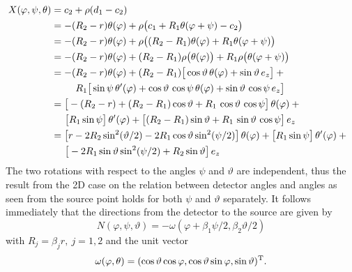 \documentclass{amsart}
\renewcommand*{\phi}{\varphi}
\begin{document}
\begin{align}
 X(\phi, \psi, \theta)
 &= c_2 + \rho(d_1 - c_2) \notag \\
 &= -(R_2 - r) \theta(\phi) + \rho\big(c_1 + R_1 \theta(\phi + \psi) - c_2\big) \notag \\
 &= -(R_2 - r) \theta(\phi) + \rho\big((R_2-R_1) \theta(\phi) + R_1 \theta(\phi + \psi)\big) \notag \\
 &= -(R_2 - r) \theta(\phi) + (R_2-R_1) \rho\big(\theta(\phi)\big) + R_1 \rho\big(\theta(\phi + \psi)\big) \notag \\
 &= -(R_2 - r) \theta(\phi) + (R_2-R_1) \big[ \cos\vartheta\, \theta(\phi) + \sin\vartheta\, e_z \big] + \phantom{x} \notag \\
 &\hspace{25pt} R_1 \big[ \sin\psi\, \theta'(\phi) + \cos\vartheta\, \cos\psi\, \theta(\phi) + \sin\vartheta\, \cos\psi\, e_z \big] \notag 
 \\
 &= \big[ -(R_2 - r) + (R_2 - R_1) \cos\vartheta + R_1 \, \cos\vartheta\, \cos\psi \big]\, \theta(\phi) + \phantom{x} \notag \\
 &\hspace{14pt} \big[R_1 \sin\psi\big]\, \theta'(\phi) + \big[ (R_2 - R_1) \sin\vartheta + R_1\, \sin\vartheta\, \cos\psi \big]\, e_z 
\notag  \\
 \label{eq:conecurved:detector_parametr}
 &= \big[ r - 2R_2 \sin^2(\vartheta/2) - 2R_1 \cos\vartheta \sin^2(\psi/2) \big]\, \theta(\phi) + \big[R_1 \sin\psi\big]\, 
 \theta'(\phi) + \phantom{x} \\
 &\hspace{14pt} \big[ -2R_1 \sin\vartheta\sin^2(\psi/2) + R_2\sin\vartheta \big]\, e_z \notag 
\end{align}
%
%
The two rotations with respect to the angles $\psi$ and $\vartheta$ are independent, thus the result from the 2D case on the relation 
between detector angles and angles as seen from the source point holds for both $\psi$ and $\vartheta$ separately. It follows immediately 
that the directions from the detector to the source are given by
%
\begin{equation}
 \label{eq:conecurved:direction_field}
 N(\phi, \psi, \vartheta) = -\omega(\phi + \beta_1\psi/2, \beta_2\vartheta/2)
\end{equation} 
%
with $R_j = \beta_j r,\ j=1,2$ and the unit vector
%
\begin{equation}
 \label{eq:conecurved:unitvec_omega}
 \omega(\phi, \theta) = \TRANSP{(\cos\vartheta \cos\phi, \cos\vartheta\sin\phi, \sin\vartheta)}.
\end{equation} 
\end{document}
